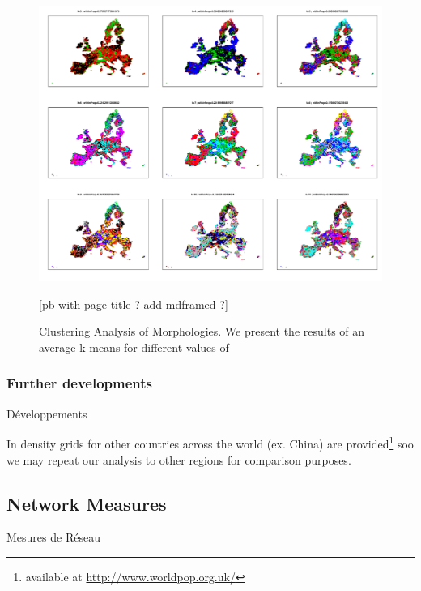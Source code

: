 \begin{figure}
\hspace{-3cm}
\includegraphics[angle=90,width=1.7\textwidth,height=\textheight]{Figures/Static/Density/clust_k3-11}
\caption[Clustering Analysis of Morphologies]{Clustering Analysis of Morphologies. We present the results of an average k-means for different values of }{[pb with page title ? add mdframed ?]}
\end{figure}






\subsubsection{Further developments}{Développements}

In \cite{10.1371/journal.pone.0107042} density grids for other countries across the world (ex. China) are provided\footnote{available at \url{http://www.worldpop.org.uk/}} soo we may repeat our analysis to other regions for comparison purposes. 



\subsection{Network Measures}{Mesures de Réseau}

